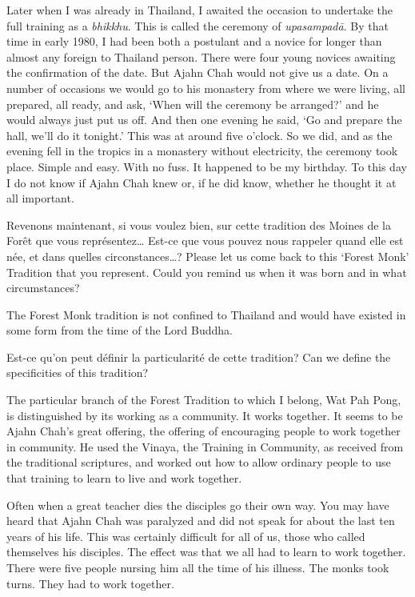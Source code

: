 Later when I was already in Thailand, I awaited the occasion to
undertake the full training as a \emph{bhikkhu}. This is called the
ceremony of \emph{upasampadā}. By that time in early 1980, I had been
both a postulant and a novice for longer than almost any foreign to
Thailand person. There were four young novices awaiting the confirmation
of the date. But Ajahn Chah would not give us a date. On a number of
occasions we would go to his monastery from where we were living, all
prepared, all ready, and ask, `When will the ceremony be arranged?' and
he would always just put us off. And then one evening he said, `Go and
prepare the hall, we'll do it tonight.' This was at around five o'clock. 
So we did, and as the evening fell in the tropics in a monastery without
electricity, the ceremony took place. Simple and easy. With no fuss. It
happened to be my birthday. To this day I do not know if Ajahn Chah knew
or, if he did know, whether he thought it at all important. 

\questionBi%
{Revenons maintenant, si vous voulez bien, sur cette tradition des Moines de la Forêt que vous représentez\ldots{} Est-ce que vous pouvez nous rappeler quand elle est née, et dans quelles circonstances\ldots{}?}%
{Please let us come back to this `Forest Monk' Tradition that you represent. Could you remind us when it was born and in what circumstances?}

\answer{}
The Forest Monk tradition is not confined to Thailand and would have
existed in some form from the time of the Lord Buddha.

\questionBi%
{Est-ce qu'on peut définir la particularité de cette tradition?}%
{Can we define the specificities of this tradition?}

\answer{}
The particular branch of the Forest Tradition to which I belong, Wat
Pah Pong, is distinguished by its working as a community. It works
together. It seems to be Ajahn Chah's great offering, the offering of
encouraging people to work together in community. He used the Vinaya, 
the Training in Community, as received from the traditional scriptures, 
and worked out how to allow ordinary people to use that training to
learn to live and work together. 

Often when a great teacher dies the disciples go their own way. You may
have heard that Ajahn Chah was paralyzed and did not speak for about the
last ten years of his life. This was certainly difficult for all of us, 
those who called themselves his disciples. The effect was that we all had
to learn to work together. There were five people nursing him all the
time of his illness. The monks took turns. They had to work together. 

